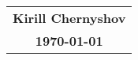 \documentclass[12pt]{article}
\newcommand{\name}{Kirill Chernyshov}
\begin{document}
\begin{center}
\begin{tabular}{c}
\textbf{\name} \\
\textbf{\today}
\end{tabular}
\end{center}
\doublespacing
\end{document}
